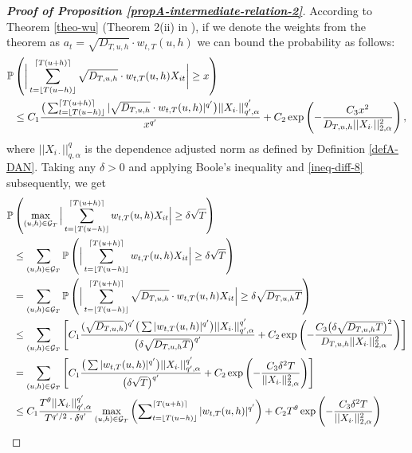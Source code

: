 \documentclass[a4paper,12pt]{article}
\begin{document}
\begin{proof}[\textnormal{\textbf{Proof of Proposition \ref{propA-intermediate-relation-2}}}]
According to Theorem \ref{theo-wu} (Theorem 2(ii) in \cite{Wu2016}), if we denote the weights from the theorem as $a_t = \sqrt{D_{T, u, h}}\cdot w_{t,T}(u,h)$ we can bound the probability as follows:
\begin{align}\label{ineq-diff-8}
\begin{split}
\mathbb{P}&\left(\bigg| \sum_{t=\lfloor T(u-h) \rfloor}^{\lceil T(u+h) \rceil} \sqrt{D_{T, u, h}}\cdot w_{t,T}(u,h)X_{it}  \bigg| \geq x\right) \\
&\leq C_1 \frac{\big( \sum_{t=\lfloor T(u-h) \rfloor}^{\lceil T(u+h) \rceil} |\sqrt{D_{T, u, h}}\cdot w_{t,T}(u,h)|^{q^\prime}\big) ||X_{i\cdot}||^{q^\prime}_{q^\prime, \alpha}}{ x^{q^\prime}} + C_2 \exp \left(-\frac{C_3  x^2}{D_{T, u, h}||X_{i\cdot}||^{2}_{2, \alpha}}\right),
\end{split}
\end{align}
where $||X_{i\cdot}||^{q}_{q, \alpha}$ is the dependence adjusted norm as defined by Definition \ref{defA-DAN}. Taking any $\delta>0$ and applying Boole's inequality and \eqref{ineq-diff-8} subsequently, we get
\begin{align*}
\pr&\left(\max_{(u, h) \in \mathcal{G}_T} \Big| \sum_{t=\lfloor T(u-h) \rfloor}^{\lceil T(u+h) \rceil} w_{t,T}(u,h)X_{it}  \Big| \geq \delta \sqrt{T} \right) \\
&\leq \sum_{(u, h) \in \mathcal{G}_T} \pr \left( \Big| \sum_{t=\lfloor T(u-h) \rfloor}^{\lceil T(u+h) \rceil} w_{t,T}(u,h)X_{it}  \Big| \geq \delta \sqrt{T} \right) \\
&= \sum_{(u, h) \in \mathcal{G}_T} \pr \left( \Big| \sum_{t=\lfloor T(u-h) \rfloor}^{\lceil T(u+h) \rceil} \sqrt{D_{T, u, h}}\cdot w_{t,T}(u,h)X_{it}  \Big| \geq \delta\sqrt{D_{T, u, h}T}  \right)  \\
&\leq \sum_{(u, h) \in \mathcal{G}_T} \left[C_1 \frac{(\sqrt{D_{T, u, h}})^{q^\prime}\big( \sum |w_{t,T}(u,h)|^{q^\prime}\big) ||X_{i\cdot}||^{q^\prime}_{q^\prime, \alpha}}{ \big(\delta\sqrt{D_{T, u, h}T}\big)^{q^\prime}} + C_2 \exp \left(-\frac{C_3 \big(\delta\sqrt{D_{T, u, h}T}\big)^2}{D_{T, u, h}||X_{i\cdot}||^{2}_{2, \alpha}}\right) \right] \\
&= \sum_{(u, h) \in \mathcal{G}_T} \left[C_1 \frac{\big( \sum |w_{t,T}(u,h)|^{q^\prime}\big) ||X_{i\cdot}||^{q^\prime}_{q^\prime, \alpha}}{ \big(\delta \sqrt{T}\big)^{q^\prime}} + C_2 \exp \left(-\frac{C_3 \delta^2 T }{||X_{i\cdot}||^{2}_{2, \alpha}}\right) \right] \\
&\leq C_1 \frac{ T^\theta ||X_{i\cdot}||^{q^\prime}_{q^\prime, \alpha}}{T^{q^\prime/2}\cdot \delta^{q^\prime}} \max_{(u, h) \in \mathcal{G}_T} \left( \sum\nolimits_{t=\lfloor T(u-h) \rfloor}^{\lceil T(u+h) \rceil} |w_{t,T}(u,h)|^{q^\prime}\right)+ C_2 T^\theta \exp \left(-\frac{C_3 \delta^2 T}{||X_{i\cdot}||^{2}_{2, \alpha}}\right) \\

\end{align*}
\end{proof}
\end{document}
